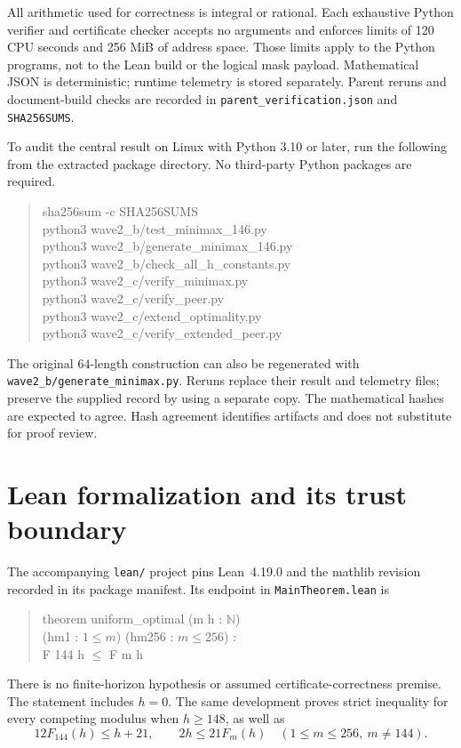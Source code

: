 \documentclass[11pt]{article}
\begin{document}
All arithmetic used for correctness is integral or rational. Each exhaustive
Python verifier and certificate checker accepts no arguments and enforces limits
of 120 CPU seconds and 256 MiB
of address space. Those limits apply to the Python programs, not to the
Lean build or the logical mask payload. Mathematical JSON is deterministic; runtime telemetry is stored
separately. Parent reruns and document-build checks are recorded in
\texttt{parent\_verification.json} and \texttt{SHA256SUMS}.

To audit the central result on Linux with Python 3.10 or later, run the
following from the extracted package directory. No third-party Python
packages are required.
\begin{quote}\small\ttfamily
sha256sum -c SHA256SUMS\\
python3 wave2\_b/test\_minimax\_146.py\\
python3 wave2\_b/generate\_minimax\_146.py\\
python3 wave2\_b/check\_all\_h\_constants.py\\
python3 wave2\_c/verify\_minimax.py\\
python3 wave2\_c/verify\_peer.py\\
python3 wave2\_c/extend\_optimality.py\\
python3 wave2\_c/verify\_extended\_peer.py
\end{quote}
The original $64$-length construction can also be regenerated with
\texttt{wave2\_b/generate\_minimax.py}. Reruns replace their result and
telemetry files; preserve the supplied record by using a separate copy.
The mathematical hashes are expected to agree. Hash agreement identifies
artifacts and does not substitute for proof review.

\section{Lean formalization and its trust boundary}\label{sec:lean}

The accompanying \texttt{lean/} project pins Lean~4.19.0 and the mathlib
revision recorded in its package manifest. Its endpoint in
\texttt{MainTheorem.lean} is
\begin{quote}\small\ttfamily
theorem uniform\_optimal (m h : $\mathbb N$)\\
\hspace*{1em}(hm1 : $1\le m$) (hm256 : $m\le256$) :\\
\hspace*{1em}F 144 h $\le$ F m h
\end{quote}
There is no finite-horizon hypothesis or assumed certificate-correctness
premise. The statement includes $h=0$. The same development proves strict
inequality for every competing modulus when $h\ge148$, as well as
\[
 12F_{144}(h)\le h+21,\qquad
 2h\le21F_m(h)\quad(1\le m\le256,\ m\ne144).
\]
\end{document}
